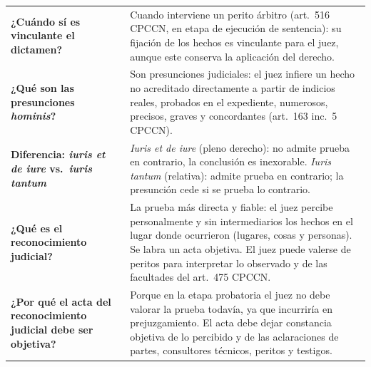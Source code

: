 \documentclass[12pt,oneside]{book}
\begin{document}
\begin{longtable}{
    >{\raggedright\arraybackslash}p{}
    >{\raggedright\arraybackslash}p{}
}
\textbf{¿Cuándo sí es vinculante el dictamen?} &
Cuando interviene un perito árbitro (art.\ 516 CPCCN, en etapa de ejecución de sentencia): su fijación de los hechos es vinculante para el juez, aunque este conserva la aplicación del derecho. \\

\textbf{¿Qué son las presunciones \textit{hominis}?} &
Son presunciones judiciales: el juez infiere un hecho no acreditado directamente a partir de indicios reales, probados en el expediente, numerosos, precisos, graves y concordantes (art.\ 163 inc.\ 5 CPCCN). \\

\textbf{Diferencia: \textit{iuris et de iure} vs.\ \textit{iuris tantum}} &
\textit{Iuris et de iure} (pleno derecho): no admite prueba en contrario, la conclusión es inexorable. \textit{Iuris tantum} (relativa): admite prueba en contrario; la presunción cede si se prueba lo contrario. \\

\textbf{¿Qué es el reconocimiento judicial?} &
La prueba más directa y fiable: el juez percibe personalmente y sin intermediarios los hechos en el lugar donde ocurrieron (lugares, cosas y personas). Se labra un acta objetiva. El juez puede valerse de peritos para interpretar lo observado y de las facultades del art.\ 475 CPCCN. \\

\textbf{¿Por qué el acta del reconocimiento judicial debe ser objetiva?} &
Porque en la etapa probatoria el juez no debe valorar la prueba todavía, ya que incurriría en prejuzgamiento. El acta debe dejar constancia objetiva de lo percibido y de las aclaraciones de partes, consultores técnicos, peritos y testigos. \\


\end{longtable}
\end{document}
